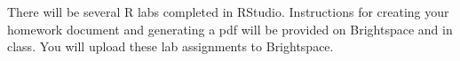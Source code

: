 There will be several R labs completed in RStudio. Instructions for creating your homework document and generating a pdf will be provided on Brightspace and in class. You will upload these lab assignments to Brightspace.